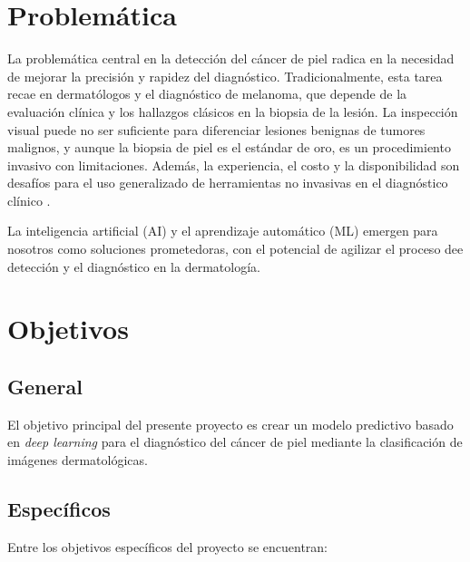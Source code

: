 \section*{Problemática}

La problemática central en la detección del cáncer de piel radica en la necesidad de mejorar la precisión y rapidez del diagnóstico. Tradicionalmente, esta tarea recae en dermatólogos y el diagnóstico de melanoma, que depende de la evaluación clínica y los hallazgos clásicos en la biopsia de la lesión. La inspección visual puede no ser suficiente para diferenciar lesiones benignas de tumores malignos, y aunque la biopsia de piel es el estándar de oro, es un procedimiento invasivo con limitaciones. Además, la experiencia, el costo y la disponibilidad son desafíos para el uso generalizado de herramientas no invasivas en el diagnóstico clínico .

La inteligencia artificial (AI) y el aprendizaje automático (ML) emergen para nosotros como soluciones prometedoras, con el potencial de agilizar el proceso dee detección y el diagnóstico en la dermatología. 
\section*{Objetivos}

\subsection*{General}

El objetivo principal del presente proyecto es crear un modelo predictivo basado en \textit{deep learning} para el diagnóstico del cáncer de piel mediante la clasificación de imágenes dermatológicas.

\subsection*{Específicos}
Entre los objetivos específicos del proyecto se encuentran:

